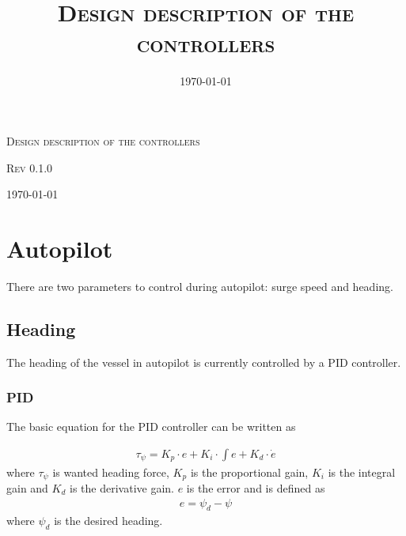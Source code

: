 \documentclass[a4paper]{article}
\title{\textsc{Design description of the controllers}}
\date{\today}
\begin{document}
\begin{titlepage}
	\centering
	{\scshape\LARGE Design description of the controllers\par}
	\vspace{1cm}
	{\scshape\Large Rev 0.1.0 \par}
	\vspace{2cm}
	\vfill

	{\large \today\par}
\end{titlepage}

\thispagestyle{empty}
\newpage

\setcounter{tocdepth}{3}
\tableofcontents
\setcounter{secnumdepth}{3}
\newpage

\section{Autopilot}

There are two parameters to control during autopilot: surge speed and heading.

\subsection{Heading}

The heading of the vessel in autopilot is currently controlled by a PID controller.

\subsubsection{PID}

The basic equation for the PID controller can be written as

\begin{equation}
\label{eq:heading_pid}
\begin{aligned}
	\tau_{\psi} = K_p \cdot e + K_i \cdot \int e + K_d \cdot \dot{e}
\end{aligned}
\end{equation}
%
where $\tau_{\psi}$ is wanted heading force, $K_p$ is the proportional gain, $K_i$ is the integral gain and $K_d$ is the derivative gain. $e$ is the error and is defined as
\begin{equation}
\label{eq:heading_pid_error}
\begin{aligned}
	e = \psi_d - \psi
\end{aligned}
\end{equation}
%
where $\psi_d$ is the desired heading.
\end{document}
